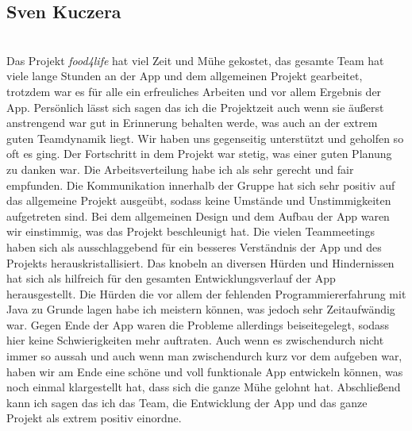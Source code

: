 \subsection{Sven Kuczera}\\
Das Projekt 
\textit{food4life} hat viel Zeit und Mühe gekostet, das gesamte Team hat viele lange Stunden an der App und dem allgemeinen Projekt gearbeitet, trotzdem war es für alle ein erfreuliches Arbeiten und vor allem Ergebnis der App. Persönlich lässt sich sagen das ich die Projektzeit auch wenn sie äußerst anstrengend war gut in Erinnerung behalten werde, was auch an der extrem guten Teamdynamik liegt. Wir haben uns gegenseitig unterstützt und geholfen so oft es ging. Der Fortschritt in dem Projekt war stetig, was einer guten Planung zu danken war. Die Arbeitsverteilung habe ich als sehr gerecht und fair empfunden. Die Kommunikation innerhalb der Gruppe hat sich sehr positiv auf das allgemeine Projekt ausgeübt, sodass keine Umstände und Unstimmigkeiten aufgetreten sind. Bei dem allgemeinen Design und dem Aufbau der App waren wir einstimmig, was das Projekt beschleunigt hat. Die vielen Teammeetings haben sich als ausschlaggebend für ein besseres Verständnis der App und des Projekts herauskristallisiert. Das knobeln an diversen Hürden und Hindernissen hat sich als hilfreich für den gesamten Entwicklungsverlauf der App herausgestellt. Die Hürden die vor allem der fehlenden Programmiererfahrung mit Java zu Grunde lagen habe ich meistern können, was jedoch sehr Zeitaufwändig war. Gegen Ende der App waren die Probleme allerdings beiseitegelegt, sodass hier keine Schwierigkeiten mehr auftraten. Auch wenn es zwischendurch nicht immer so aussah und auch wenn man zwischendurch kurz vor dem aufgeben war, haben wir am Ende eine schöne und voll funktionale App entwickeln können, was noch einmal klargestellt hat, dass sich die ganze Mühe gelohnt hat. Abschließend kann ich sagen das ich das Team, die Entwicklung der App und das ganze Projekt als extrem positiv einordne.

\\
